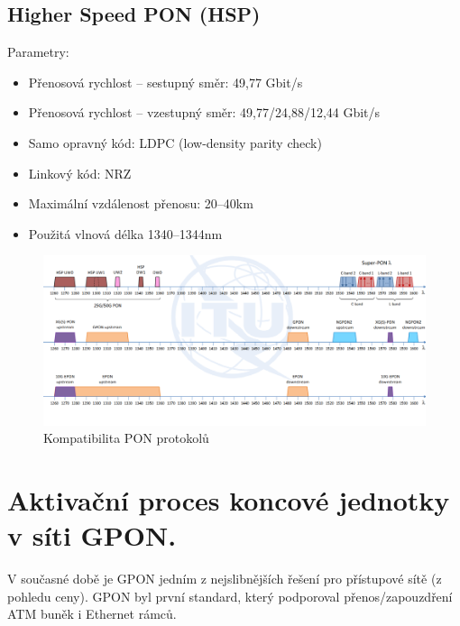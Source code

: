 \subsection{Higher Speed PON (HSP)}
Parametry:
\begin{itemize}
    \item Přenosová rychlost -- sestupný směr: 49,77 Gbit/s
    \item Přenosová rychlost -- vzestupný směr: 49,77/24,88/12,44 Gbit/s
    \item Samo opravný kód: LDPC (low-density parity check)
    \item Linkový kód: NRZ
    \item Maximální vzdálenost přenosu: 20--40km
    \item Použitá vlnová délka 1340--1344nm
\end{itemize}

\begin{figure}[h]
    \centering
    \includegraphics[width=\textwidth]{snimky/pon-kompatibilita.png}
    \caption{Kompatibilita PON protokolů}
\end{figure}

\clearpage
\section{Aktivační proces koncové jednotky v síti GPON.}
V současné době je GPON jedním z nejslibnějších řešení pro přístupové sítě (z pohledu ceny). GPON byl první standard, který podporoval přenos/zapouzdření ATM buněk i Ethernet rámců.

